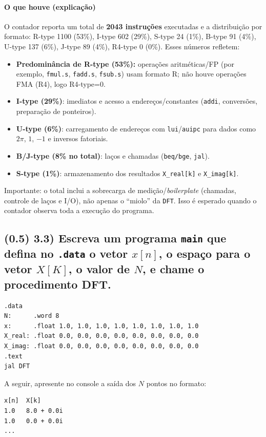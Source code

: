 \documentclass[12pt,a4paper]{article}
\begin{document}
\paragraph{O que houve (explicação)}
O contador reporta um total de \textbf{2043 instruções} executadas e a distribuição por formato: R-type 1100 (53\%), I-type 602 (29\%), S-type 24 (1\%), B-type 91 (4\%), U-type 137 (6\%), J-type 89 (4\%), R4-type 0 (0\%). Esses números refletem:
\begin{itemize}
    \item \textbf{Predominância de R-type (53\%):} operações aritméticas/FP (por exemplo, \texttt{fmul.s}, \texttt{fadd.s}, \texttt{fsub.s}) usam formato R; não houve operações FMA (R4), logo R4-type=0.
    \item \textbf{I-type (29\%)}: imediatos e acesso a endereços/constantes (\texttt{addi}, conversões, preparação de ponteiros).
    \item \textbf{U-type (6\%)}: carregamento de endereços com \texttt{lui}/\texttt{auipc} para dados como $2\pi$, $1$, $-1$ e inversos fatoriais.
    \item \textbf{B/J-type (8\% no total)}: laços e chamadas (\texttt{beq/bge}, \texttt{jal}).
    \item \textbf{S-type (1\%)}: armazenamento dos resultados \texttt{X\_real[k]} e \texttt{X\_imag[k]}.
\end{itemize}
Importante: o total inclui a sobrecarga de medição/\textit{boilerplate} (chamadas, controle de laços e I/O), não apenas o “miolo” da \texttt{DFT}. Isso é esperado quando o contador observa toda a execução do programa.

\subsection*{(0.5) 3.3) Escreva um programa \texttt{main} que defina no \texttt{.data} o vetor $x[n]$, o espaço para o vetor $X[K]$, o valor de $N$, e chame o procedimento DFT.}

\begin{verbatim}
.data
N:      .word 8
x:      .float 1.0, 1.0, 1.0, 1.0, 1.0, 1.0, 1.0, 1.0
X_real: .float 0.0, 0.0, 0.0, 0.0, 0.0, 0.0, 0.0, 0.0
X_imag: .float 0.0, 0.0, 0.0, 0.0, 0.0, 0.0, 0.0, 0.0
.text
jal DFT
\end{verbatim}
A seguir, apresente no console a saída dos $N$ pontos no formato:
\begin{verbatim}
x[n]  X[k]
1.0   8.0 + 0.0i
1.0   0.0 + 0.0i
...
\end{verbatim}
\end{document}
